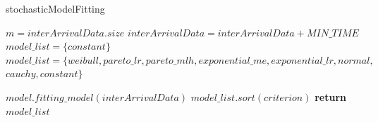 \begin{algorithm}[ht!]
    \caption{stochasticModelFitting}
    \label{alg:stochasticModelFitting}
    \begin{algorithmic}[1]
        \small        {}
        \State $m = interArrivalData.size$
        \State $interArrivalData = interArrivalData + MIN\_TIME$
        \State $model\_list = \{constant\}$
        \Else
        \State $model\_list = \{weibull, pareto\_lr, pareto\_mlh, exponential\_me, exponential\_lr, normal,$
        \State $cauchy, constant\}$
        \EndIf
        
        \State $model.fitting\_model(interArrivalData)$
        \EndFor
        \State $model\_list.sort(criterion)$
        \State \textbf{return} $model\_list$
        \EndFunction
    \end{algorithmic}
\end{algorithm}
